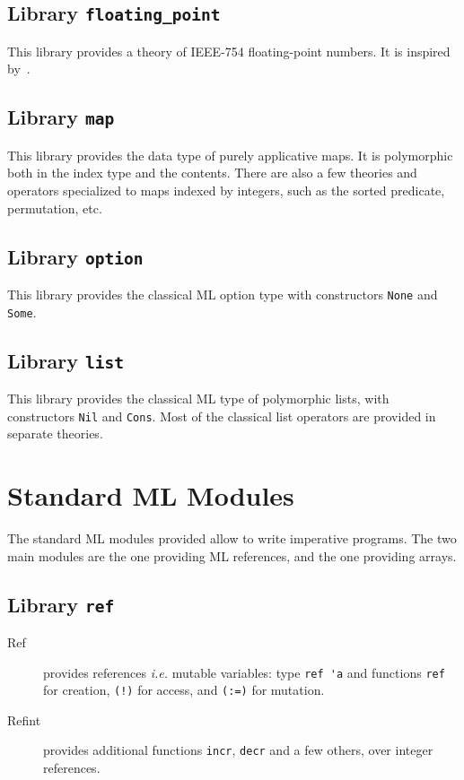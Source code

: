 \subsection{Library \texttt{floating\_point}}

This library provides a theory of IEEE-754 floating-point numbers. It
is inspired by~\cite{ayad10ijcar}.

\subsection{Library \texttt{map}}

This library provides the data type of purely applicative maps. It is
polymorphic both in the index type and the contents. There are also a
few theories and operators specialized to maps indexed by integers,
such as the sorted predicate, permutation, etc.

\subsection{Library \texttt{option}}

This library provides the classical ML option type with constructors
\verb|None| and \verb|Some|.

\subsection{Library \texttt{list}}

This library provides the classical ML type of polymorphic lists, with
constructors \verb|Nil| and \verb|Cons|. Most of the classical list
operators are provided in separate theories.

\section{Standard ML Modules}
\label{sec:mllibrary}

The standard ML modules provided allow to write imperative
programs. The two main modules are the one providing ML references,
and the one providing arrays.

\subsection{Library \texttt{ref}}


\begin{description}
\item[Ref] provides references \emph{i.e.} mutable variables:
  type \verb|ref 'a| and functions \verb|ref| for creation,
  \verb|(!)| for access, and \verb|(:=)| for mutation.
\item[Refint] provides additional functions \texttt{incr},
  \texttt{decr} and a few others, over integer references.
\end{description}

